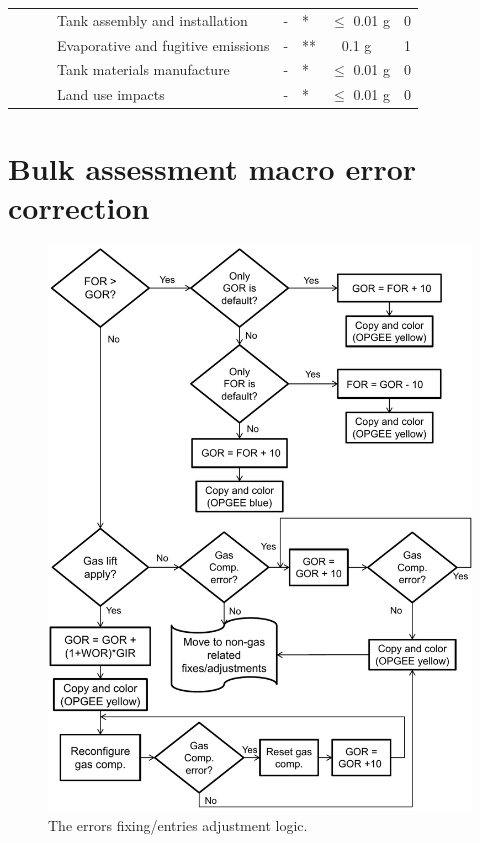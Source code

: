 \documentclass[11pt]{report}
\begin{document}
{{{{\begin{landscape}
\begin{table}
\begin{scriptsize}
\begin{tabular}{|p{}|p{}|p{}|p{}|p{}|p{}|p{}|p{}|}
\cline{4-8}
& & & Tank assembly and installation & - & * & $\leq$ 0.01 g & 0\\
\cline{4-8}
& & & Evaporative and fugitive emissions & - & ** & ~ 0.1 g & 1\\
\cline{4-8}
& & & Tank materials manufacture & - & * & $\leq$ 0.01 g & 0\\
\cline{4-8}
& & & Land use impacts & - & * & $\leq$ 0.01 g & 0\\
\hline
\end{tabular}
\end{scriptsize}
\end{table}
\end{landscape}




\chapter{Bulk assessment macro error correction}\label{sec:macro_error}


\begin{figure}[t]
\includegraphics[width=0.8\columnwidth]{images/macro_logic_2a.pdf}
\caption{The errors fixing/entries adjustment logic.}
\label{fig:macro_logic_2}
\end{figure}

}}}}
\end{document}
